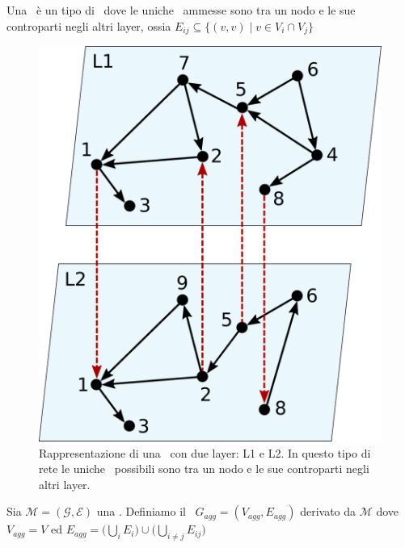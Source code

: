 \begin{definizione} 
    \label{def:mulx}
    Una \mulx\ è un tipo di \muln\ dove le uniche \interc\ ammesse sono tra un 
    nodo e le sue controparti negli altri layer, ossia 
    $E_{ij} \subseteq \{ (v,v) \mid v \in {V_i \cap V_j} \} $
\end{definizione}

\begin{figure}
    \centering
    \includegraphics[height=0.3\textheight]{img/muxexample1.pdf}
    \caption{Rappresentazione di una \mulx\ con due layer: L1 e L2. In questo 
    tipo di rete le uniche \interc\ possibili sono tra un nodo e le sue controparti 
    negli altri layer.}
    \label{fig:muxexample}
\end{figure}


\begin{definizione} 
    \label{def:gragg}
    Sia $\mathcal{M} = (\mathcal{G}, \mathcal{E} )$ una \muln. 
    Definiamo il \gragg\ $G_{agg} = (V_{agg}, E_{agg})$ derivato
    da $\mathcal{M}$ dove $V_{agg} = V$ ed 
    $E_{agg} = \biggl( \bigcup\limits_{i} E_{i} \biggr) \cup 
                    \biggl( \bigcup\limits_{i \neq j} E_{ij} \biggr)$
\end{definizione}

